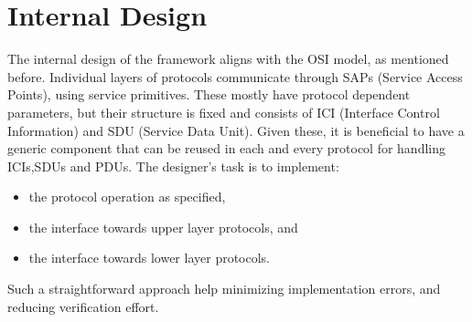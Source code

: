 \documentclass[journal]{IEEEtran}
\begin{document}
\IEEEpubidadjcol

\section{Internal Design}\label{sec:Internal Design}

The internal design of the framework aligns with the OSI model, as mentioned before. Individual layers of protocols
communicate through SAPs (Service Access Points), using service primitives.
These mostly have protocol dependent parameters, but their structure is fixed and consists of ICI (Interface Control
Information) and SDU (Service Data Unit). Given these, it is beneficial to have a generic component that can be reused
in each and every protocol for handling ICIs,SDUs and PDUs. The designer's task is to implement:
\begin{itemize}
    \renewcommand \labelitemi{--}
    \item the protocol operation as specified,
    \item the interface towards upper layer protocols, and
    \item the interface towards lower layer protocols.
\end{itemize}

Such a straightforward approach help minimizing implementation errors, and reducing verification effort.
\end{document}
